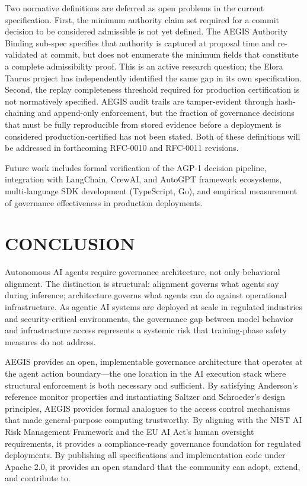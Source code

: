 \documentclass{IEEEcsmag}
\begin{document}
Two normative definitions are deferred as open problems in the current specification. First, the minimum authority claim set required for a commit decision to be considered admissible is not yet defined. The AEGIS Authority Binding sub-spec specifies that authority is captured at proposal time and re-validated at commit, but does not enumerate the minimum fields that constitute a complete admissibility proof. This is an active research question; the Elora Taurus project has independently identified the same gap in its own specification. Second, the replay completeness threshold required for production certification is not normatively specified. AEGIS audit trails are tamper-evident through hash-chaining and append-only enforcement, but the fraction of governance decisions that must be fully reproducible from stored evidence before a deployment is considered production-certified has not been stated. Both of these definitions will be addressed in forthcoming RFC-0010 and RFC-0011 revisions.

Future work includes formal verification of the AGP-1 decision pipeline, integration with LangChain, CrewAI, and AutoGPT framework ecosystems, multi-language SDK development (TypeScript, Go), and empirical measurement of governance effectiveness in production deployments.

\section{CONCLUSION}

Autonomous AI agents require governance architecture, not only behavioral alignment. The distinction is structural: alignment governs what agents say during inference; architecture governs what agents can do against operational infrastructure. As agentic AI systems are deployed at scale in regulated industries and security-critical environments, the governance gap between model behavior and infrastructure access represents a systemic risk that training-phase safety measures do not address.

AEGIS provides an open, implementable governance architecture that operates at the agent action boundary---the one location in the AI execution stack where structural enforcement is both necessary and sufficient. By satisfying Anderson's reference monitor properties and instantiating Saltzer and Schroeder's design principles, AEGIS provides formal analogues to the access control mechanisms that made general-purpose computing trustworthy. By aligning with the NIST AI Risk Management Framework and the EU AI Act's human oversight requirements, it provides a compliance-ready governance foundation for regulated deployments. By publishing all specifications and implementation code under Apache 2.0, it provides an open standard that the community can adopt, extend, and contribute to.
\end{document}
